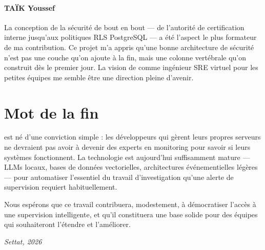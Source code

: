 \paragraph{TAÏK Youssef}
La conception de la sécurité de bout en bout --- de l'autorité de certification
interne jusqu'aux politiques RLS PostgreSQL --- a été l'aspect le plus
formateur de ma contribution. Ce projet m'a appris qu'une bonne architecture
de sécurité n'est pas une couche qu'on ajoute à la fin, mais une colonne
vertébrale qu'on construit dès le premier jour. La vision de \caimp{} comme
ingénieur SRE virtuel pour les petites équipes me semble être une direction
pleine d'avenir.

\section{Mot de la fin}

\caimp{} est né d'une conviction simple : les développeurs qui gèrent leurs
propres serveurs ne devraient pas avoir à devenir des experts en monitoring
pour savoir si leurs systèmes fonctionnent. La technologie est aujourd'hui
suffisamment mature --- LLMs locaux, bases de données vectorielles, architectures
événementielles légères --- pour automatiser l'essentiel du travail d'investigation
qu'une alerte de supervision requiert habituellement.

Nous espérons que ce travail contribuera, modestement, à démocratiser l'accès
à une supervision intelligente, et qu'il constituera une base solide pour des
équipes qui souhaiteront l'étendre et l'améliorer.

\bigskip
\begin{flushright}
\textit{Settat, 2026}
\end{flushright}

